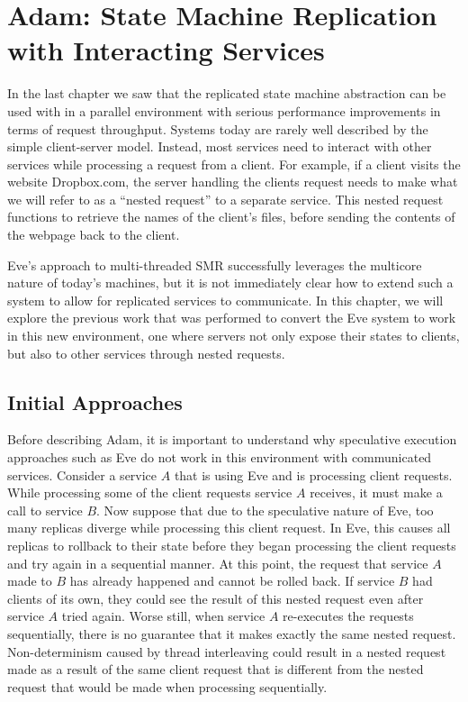 \documentclass[11pt, oneside]{report}
\begin{document}
\chapter{Adam: State Machine Replication with Interacting Services}\label{Adam}

In the last chapter we saw that the replicated state machine abstraction can be used with in a parallel environment with serious performance improvements in terms of request throughput. 
Systems today are rarely well described by the simple client-server model.
Instead, most services need to interact with other services while processing a request from a client. 
For example, if a client visits the website Dropbox.com, the server handling the clients request needs to make what we will refer to as a ``nested request'' to a separate service. This nested request functions to retrieve the names of the client's files, before sending the contents of the webpage back to the client. 

Eve's approach to multi-threaded SMR successfully leverages the multicore nature of today's machines, but it is not immediately clear how to extend such a system to allow for replicated services to communicate. 
In this chapter, we will explore the previous work that was performed to convert the Eve system to work in this new environment, one where servers not only expose their states to clients, but also to other services through nested requests.

\section{Initial Approaches}

Before describing Adam, it is important to understand why speculative execution approaches such as Eve do not work in this environment with communicated services. 
Consider a service $A$ that is using Eve and is processing client requests. 
While processing some of the client requests service $A$ receives, it must make a call to service $B$. 
Now suppose that due to the speculative nature of Eve, too many replicas diverge while processing this client request. In Eve, this causes all replicas to rollback to their state before they began processing the client requests and try again in a sequential manner. 
At this point, the request that service $A$ made to $B$ has already happened and cannot be rolled back. 
If service $B$ had clients of its own, they could see the result of this nested request even after service $A$ tried again. 
Worse still, when service $A$ re-executes the requests sequentially, there is no guarantee that it makes exactly the same nested request. 
Non-determinism caused by thread interleaving could result in a nested request made as a result of the same client request that is different from the nested request that would be made when processing sequentially.
\end{document}
